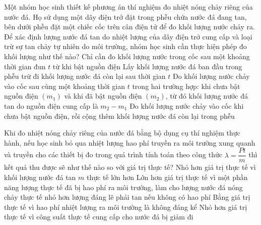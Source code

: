 \begin{ex}
Một nhóm học sinh thiết kế phương án thí nghiệm đo nhiệt nóng chảy riêng của nước đá. Họ sử dụng một dây điện trở đặt trong phễu chứa nước đá đang tan, bên dưới phễu đặt một chiếc cốc trên cân điện tử để đo khối lượng nước chảy ra. Để xác định lượng nước đá tan do nhiệt lượng của dây điện trở cung cấp và loại trừ sự tan chảy tự nhiên do môi trường, nhóm học sinh cần thực hiện phép đo khối lượng như thế nào?
\choice
{Chỉ cần đo khối lượng nước trong cốc sau một khoảng thời gian đun $t$ từ khi bật nguồn điện}
{Lấy khối lượng nước đá ban đầu trong phễu trừ đi khối lượng nước đá còn lại sau thời gian $t$}
{\True Đo khối lượng nước chảy vào cốc sau cùng một khoảng thời gian $t$ trong hai trường hợp: khi chưa bật nguồn điện $(m_1)$ và khi đã bật nguồn điện $(m_2)$, từ đó khối lượng nước đá tan do nguồn điện cung cấp là $m_2-m_1$}
{Đo khối lượng nước chảy vào cốc khi chưa bật nguồn điện, rồi cộng thêm khối lượng nước đá còn lại trong phễu}
\end{ex}

\begin{ex}
Khi đo nhiệt nóng chảy riêng của nước đá bằng bộ dụng cụ thí nghiệm thực hành, nếu học sinh bỏ qua nhiệt lượng hao phí truyền ra môi trường xung quanh và truyền cho các thiết bị đo trong quá trình tính toán theo công thức $\lambda=\dfrac{Pt}{m}$ thì kết quả thu được sẽ như thế nào so với giá trị thực tế?
\choice
{Nhỏ hơn giá trị thực tế vì khối lượng nước đá tan $m$ thực tế lớn hơn}
{\True Lớn hơn giá trị thực tế vì một phần năng lượng thực tế đã bị hao phí ra môi trường, làm cho lượng nước đá nóng chảy thực tế nhỏ hơn lượng đáng lẽ phải tan nếu không có hao phí}
{Bằng giá trị thực tế vì hao phí nhiệt lượng ra môi trường là không đáng kể}
{Nhỏ hơn giá trị thực tế vì công suất thực tế cung cấp cho nước đá bị giảm đi}
\end{ex}

